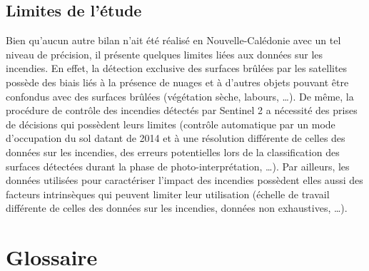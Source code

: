 \documentclass[
  11pt,
  letterpaper,
]{scrreprt}
\begin{document}
\section*{Limites de l'étude}\label{limites-de-luxe9tude}


Bien qu'aucun autre bilan n'ait été réalisé en Nouvelle-Calédonie avec
un tel niveau de précision, il présente quelques limites liées aux
données sur les incendies. En effet, la détection exclusive des surfaces
brûlées par les satellites possède des biais liés à la présence de
nuages et à d'autres objets pouvant être confondus avec des surfaces
brûlées (végétation sèche, labours, \ldots). De même, la procédure de
contrôle des incendies détectés par Sentinel 2 a nécessité des prises de
décisions qui possèdent leurs limites (contrôle automatique par un mode
d'occupation du sol datant de 2014 et à une résolution différente de
celles des données sur les incendies, des erreurs potentielles lors de
la classification des surfaces détectées durant la phase de
photo-interprétation, \ldots). Par ailleurs, les données utilisées pour
caractériser l'impact des incendies possèdent elles aussi des facteurs
intrinsèques qui peuvent limiter leur utilisation (échelle de travail
différente de celles des données sur les incendies, données non
exhaustives, \ldots).


\chapter*{Glossaire}\label{glossaire}

\end{document}
